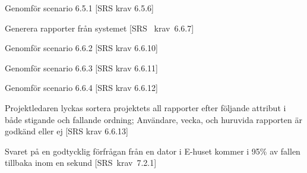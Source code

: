 \documentclass[a4paper]{article}
\begin{document}
\begin{appendices}
\begin{ST}
\item
Genomför scenario 6.5.1 [SRS krav 6.5.6]

\item
Generera rapporter från systemet [SRS~ krav~6.6.7]

\item
Genomför scenario 6.6.2 [SRS krav 6.6.10]

\item
Genomför scenario 6.6.3 [SRS krav 6.6.11]

\item
Genomför scenario 6.6.4 [SRS krav 6.6.12]

\item
Projektledaren lyckas sortera projektets all rapporter efter följande attribut i både stigande och fallande ordning; Användare, vecka, och huruvida rapporten är godkänd eller ej [SRS krav 6.6.13]



\item
Svaret på en godtycklig förfrågan från en dator i E-huset kommer i 95\% av fallen tillbaka inom en sekund [SRS~krav~7.2.1]

\end{ST}




\end{appendices}

\newpage
\end{document}
